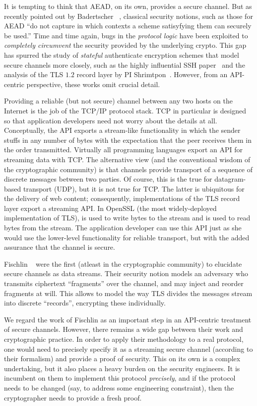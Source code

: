 It is tempting to think that AEAD, on its own, provides a secure channel.  But
as recently pointed out by Badertscher \etal~\cite{BMM+15}, classical security
notions, such as those for AEAD ``do not capture in which contexts a scheme
satisyfying them can securely be used.'' Time and time again, bugs  in the
\emph{protocol logic} have been exploited to \emph{completely circumvent} the
security provided by the underlying crypto.  This gap has spurred the study of
\emph{stateful} authenticate encryption schemes that model secure channels more
closely, such as the highly influential SSH paper~\cite{BKN02} and the analysis
of the TLS $1.2$ record layer by PI Shrimtpon~\cite{PRS11}. However, from an
API-centric perspective, these works omit crucial detail.

Providing a reliable (but not secure) channel between any two hosts on the Internet
is the job of the TCP/IP protocol stack. TCP in particular is designed so that
application developers need not worry about the details at all.
%
Conceptually, the API exports a stream-like functionality in which the sender
stuffs in any number of bytes with the expectation that the peer receives them
in the order transmitted.
%
Virtually all programming languages export an API for streaming data with TCP. The
alternative view (and the conventional wisdom of the cryptographic community) is
that channels provide transport of a sequence of discrete messages between two
parties. Of course, this is the true for datagram-based transport (UDP), but it
is not true for TCP.
%
The latter is ubiquitous for the delivery of web content; consequently,
implementations of the TLS record layer export a streaming API. In OpenSSL (the
most widely-deployed implementation of TLS),  is used to
write bytes to the stream and  is used to read bytes from
the stream. The application developer can use this API just as she would use the
lower-level functionality for reliable transport, but with the added assurance
that the channel is secure.

Fischlin \etal~\cite{FPMG15} were the first (atleast in the cryptographic
community) to elucidate secure channels as data streams.
%
Their security notion models an adversary who transmits ciphertext ``fragments''
over the channel, and may inject and reorder fragments at will. This allows to
model the way TLS divides the messages stream into discrete ``records'',
encrypting these individually.

We regard the work of Fischlin \etal as an
important step in an API-centric treatment of secure channels.
However, there remains a wide gap between their work and cryptographic practice.
In order to apply their methodology to a real protocol, one would need to
precisely specify it as a streaming secure channel (according to their
formalism) and provide a proof of security. This on its own is a complex
undertaking, but it also places a heavy burden on the security engineers. It is
incumbent on them to implement this protocol \emph{precisely}, and if the
protocol needs to be changed (say, to address some engineering constraint), then
the cryptographer needs to provide a fresh proof.

